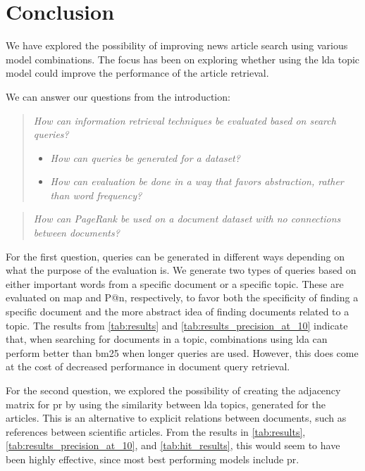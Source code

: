 \section{Conclusion}\label{sec:conclusion}
We have explored the possibility of improving news article search using various model combinations.
The focus has been on exploring whether using the \gls{lda} topic model could improve the performance of the article retrieval.

We can answer our questions from the introduction:
\begin{quote}
	\emph{How can information retrieval techniques be evaluated based on search queries?}
	\begin{itemize}
		\item \emph{How can queries be generated for a dataset?}
		\item \emph{How can evaluation be done in a way that favors abstraction, rather than word frequency?}
	\end{itemize}
\end{quote}
\vspace{0.1 cm}

\begin{quote}
	\emph{How can PageRank be used on a document dataset with no connections between documents?}
\end{quote}

For the first question, queries can be generated in different ways depending on what the purpose of the evaluation is.
We generate two types of queries based on either important words from a specific document or a specific topic.
These are evaluated on \acrlong{map} and P@n, respectively, to favor both the specificity of finding a specific document and the more abstract idea of finding documents related to a topic.
The results from \autoref{tab:results} and \autoref{tab:results_precision_at_10} indicate that, when searching for documents in a topic, combinations using \gls{lda} can perform better than \gls{bm25} when longer queries are used.
However, this does come at the cost of decreased performance in document query retrieval.

For the second question, we explored the possibility of creating the adjacency matrix for \gls{pr} by using the similarity between \gls{lda} topics, generated for the articles.
This is an alternative to explicit relations between documents, such as references between scientific articles.
From the results in \autoref{tab:results}, \autoref{tab:results_precision_at_10}, and \autoref{tab:hit_results}, this would seem to have been highly effective, since most best performing models include \gls{pr}.
